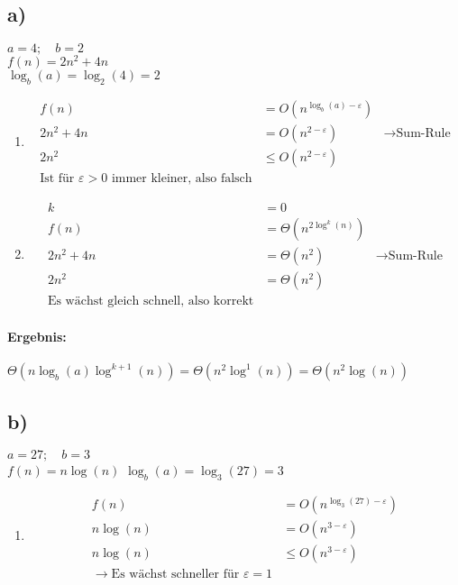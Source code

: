 \documentclass[12pt,letterpaper]{article}
\begin{document}
\subsection*{a)}
$a = 4;\quad b = 2$ \\
$f(n) =  2n^2 + 4n$ \\
$\log_b(a) = \log_2(4) = 2$
\begin{enumerate}
    \item \begin{align*}
              f(n)      & = O(n^{\log_b(a) - \varepsilon})                               \\
              2n^2 + 4n & = O(n^{2 - \varepsilon})         & \rightarrow \text{Sum-Rule} \\
              2n^2      & \leq O(n^{2 - \varepsilon})                                    \\
              \text{Ist für } \varepsilon > 0 \text{ immer kleiner, also falsch}
          \end{align*}
    \item \begin{align*}
              k         & = 0                                                    \\
              f(n)      & = \Theta(n^{2\log^k(n)})                               \\
              2n^2 + 4n & = \Theta(n^2)            & \rightarrow \text{Sum-Rule} \\
              2n^2      & = \Theta(n^2)                                          \\
              \text{Es wächst gleich schnell, also korrekt}
          \end{align*}
\end{enumerate}
\paragraph{Ergebnis:}
$ \Theta(n \log_b(a)\log^{k+1}(n)) = \Theta(n^2 \log^1(n)) = \Theta(n^2 \log(n))$


\subsection*{b)}
$a = 27;\quad b = 3$ \\
$f(n) =  n \log(n)$
$\log_b(a) = \log_3(27) = 3$
\begin{enumerate}
    \item \begin{align*}
              f(n)      & = O(n^{\log_3(27) - \varepsilon}) \\
              n \log(n) & = O(n^{3 - \varepsilon})          \\
              n \log(n) & \leq O(n^{3 - \varepsilon})       \\
              \rightarrow \text{Es wächst schneller für } \varepsilon = 1
          \end{align*}
\end{enumerate}
\end{document}
